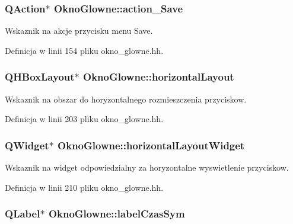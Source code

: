 \subsubsection[{action\+\_\+\+Save}]{\setlength{\rightskip}{0pt plus 5cm}Q\+Action$\ast$ Okno\+Glowne\+::action\+\_\+\+Save}\label{class_okno_glowne_a2c2d825b6e5e0faa5eb368be4fc73b78}
Wskaznik na akcje przycisku menu Save. 

Definicja w linii 154 pliku okno\+\_\+glowne.\+hh.

\hypertarget{class_okno_glowne_aacb5ddb6d0eb560a47917cc1b457239a}{}
\subsubsection[{horizontal\+Layout}]{\setlength{\rightskip}{0pt plus 5cm}Q\+H\+Box\+Layout$\ast$ Okno\+Glowne\+::horizontal\+Layout}\label{class_okno_glowne_aacb5ddb6d0eb560a47917cc1b457239a}
Wskaznik na obszar do horyzontalnego rozmieszczenia przyciskow. 

Definicja w linii 203 pliku okno\+\_\+glowne.\+hh.

\hypertarget{class_okno_glowne_a12ac2d00b9ca186176ccc710a928a723}{}
\subsubsection[{horizontal\+Layout\+Widget}]{\setlength{\rightskip}{0pt plus 5cm}Q\+Widget$\ast$ Okno\+Glowne\+::horizontal\+Layout\+Widget}\label{class_okno_glowne_a12ac2d00b9ca186176ccc710a928a723}
Wskaznik na widget odpowiedzialny za horyzontalne wyswietlenie przyciskow. 

Definicja w linii 210 pliku okno\+\_\+glowne.\+hh.

\hypertarget{class_okno_glowne_aca07e1dc5cbe30d6952f9b952073bb79}{}
\subsubsection[{label\+Czas\+Sym}]{\setlength{\rightskip}{0pt plus 5cm}Q\+Label$\ast$ Okno\+Glowne\+::label\+Czas\+Sym}\label{class_okno_glowne_aca07e1dc5cbe30d6952f9b952073bb79}


